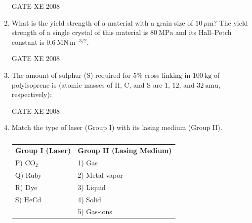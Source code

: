 \documentclass[12pt]{article}
\begin{document}
\begin{enumerate}[label=Q\arabic*.]
GATE XE 2008

\item What is the yield strength of a material with a grain size of $10 \ \mu \mathrm{m}$? The yield strength of a single crystal of this material is $80 \ \mathrm{MPa}$ and its Hall–Petch constant is $0.6 \ \mathrm{MN \, m^{-3/2}}$.

\begin{enumerate}[label=(\Alph*)]
\end{enumerate}

GATE XE 2008

\item The amount of sulphur (S) required for $5\%$ cross linking in $100 \ \mathrm{kg}$ of polyisoprene is (atomic masses of H, C, and S are $1$, $12$, and $32 \ \mathrm{amu}$, respectively):

\begin{enumerate}[label=(\Alph*)]
\end{enumerate}

GATE XE 2008

\item Match the type of laser (Group I) with its lasing medium (Group II).

\begin{table}[H]     \centering     \caption{}     \label{}     \begin{tabular}{l l}
\textbf{Group I (Laser)} & \textbf{Group II (Lasing Medium)} \\
P) CO$_2$ & 1) Gas \\
Q) Ruby & 2) Metal vapor \\
R) Dye & 3) Liquid \\
S) HeCd & 4) Solid \\
 & 5) Gas-ions \\
\end{tabular} \end{table}


\end{enumerate}
\end{document}
